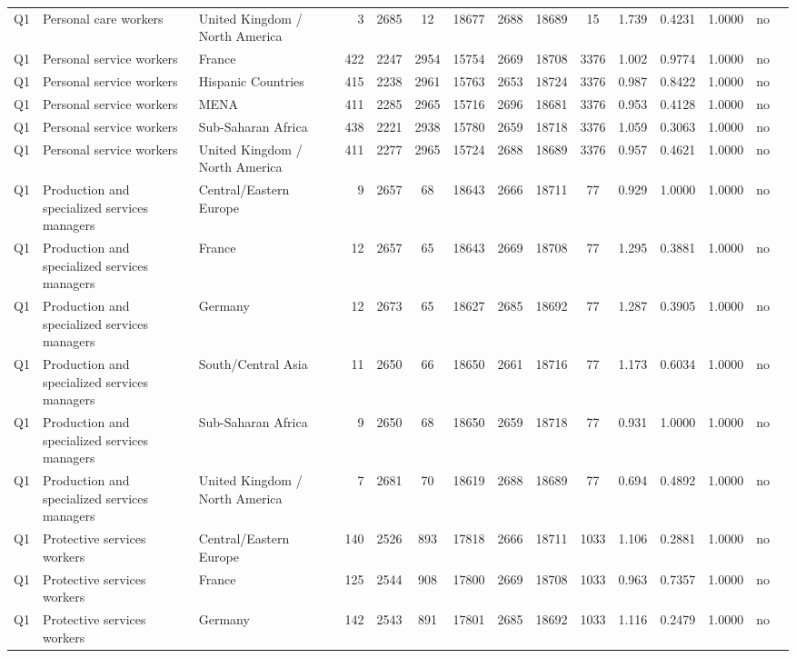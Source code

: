 \begin{longtable}{lllrcccccccccll}
Q1 & Personal care workers & United Kingdom / North America & 3 & 2685 & 12 & 18677 & 2688 & 18689 & 15 & 1.739 & 0.4231 & 1.0000 & no \\
Q1 & Personal service workers & France & 422 & 2247 & 2954 & 15754 & 2669 & 18708 & 3376 & 1.002 & 0.9774 & 1.0000 & no \\
Q1 & Personal service workers & Hispanic Countries & 415 & 2238 & 2961 & 15763 & 2653 & 18724 & 3376 & 0.987 & 0.8422 & 1.0000 & no \\
Q1 & Personal service workers & MENA & 411 & 2285 & 2965 & 15716 & 2696 & 18681 & 3376 & 0.953 & 0.4128 & 1.0000 & no \\
Q1 & Personal service workers & Sub-Saharan Africa & 438 & 2221 & 2938 & 15780 & 2659 & 18718 & 3376 & 1.059 & 0.3063 & 1.0000 & no \\
Q1 & Personal service workers & United Kingdom / North America & 411 & 2277 & 2965 & 15724 & 2688 & 18689 & 3376 & 0.957 & 0.4621 & 1.0000 & no \\
Q1 & Production and specialized services managers & Central/Eastern Europe & 9 & 2657 & 68 & 18643 & 2666 & 18711 & 77 & 0.929 & 1.0000 & 1.0000 & no \\
Q1 & Production and specialized services managers & France & 12 & 2657 & 65 & 18643 & 2669 & 18708 & 77 & 1.295 & 0.3881 & 1.0000 & no \\
Q1 & Production and specialized services managers & Germany & 12 & 2673 & 65 & 18627 & 2685 & 18692 & 77 & 1.287 & 0.3905 & 1.0000 & no \\
Q1 & Production and specialized services managers & South/Central Asia & 11 & 2650 & 66 & 18650 & 2661 & 18716 & 77 & 1.173 & 0.6034 & 1.0000 & no \\
Q1 & Production and specialized services managers & Sub-Saharan Africa & 9 & 2650 & 68 & 18650 & 2659 & 18718 & 77 & 0.931 & 1.0000 & 1.0000 & no \\
Q1 & Production and specialized services managers & United Kingdom / North America & 7 & 2681 & 70 & 18619 & 2688 & 18689 & 77 & 0.694 & 0.4892 & 1.0000 & no \\
Q1 & Protective services workers & Central/Eastern Europe & 140 & 2526 & 893 & 17818 & 2666 & 18711 & 1033 & 1.106 & 0.2881 & 1.0000 & no \\
Q1 & Protective services workers & France & 125 & 2544 & 908 & 17800 & 2669 & 18708 & 1033 & 0.963 & 0.7357 & 1.0000 & no \\
Q1 & Protective services workers & Germany & 142 & 2543 & 891 & 17801 & 2685 & 18692 & 1033 & 1.116 & 0.2479 & 1.0000 & no \\

\end{longtable}
